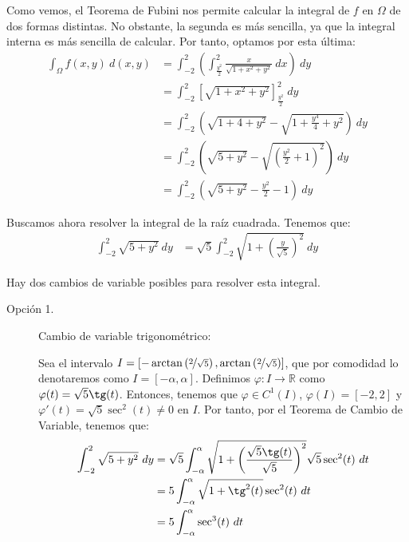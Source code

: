 \begin{ejercicio}
\begin{enumerate}
        Como vemos, el Teorema de Fubini nos permite calcular la integral de $f$ en $\Omega$ de dos formas distintas. No obstante,
        la segunda es más sencilla, ya que la integral interna es más sencilla de calcular. Por tanto, optamos por esta última:
        \begin{align*}
            \int_{\Omega} f(x, y)~d(x, y)
            &= \int_{-2}^{2} \left( \int_{\frac{y^2}{2}}^{2} \frac{x}{\sqrt{1 + x^2 + y^2}}~dx \right)~dy \\
            &= \int_{-2}^{2} \left[ \sqrt{1 + x^2 + y^2} \right]_{\frac{y^2}{2}}^{2}~dy \\
            &= \int_{-2}^{2} \left( \sqrt{1 + 4 + y^2} - \sqrt{1 + \frac{y^4}{4} + y^2} \right)~dy \\
            &= \int_{-2}^{2} \left( \sqrt{5 + y^2} -  \sqrt{\left(\frac{y^2}{2}+1\right)^2} \right)~dy \\
            &= \int_{-2}^{2} \left( \sqrt{5 + y^2} -  \frac{y^2}{2} -1 \right)~dy
        \end{align*}

        Buscamos ahora resolver la integral de la raíz cuadrada. Tenemos que:
        \begin{align*}
            \int_{-2}^{2} \sqrt{5 + y^2}~dy
            &= \sqrt{5}\int_{-2}^{2} \sqrt{1 + \left(\frac{y}{\sqrt{5}}\right)^2}~dy
        \end{align*}

        Hay dos cambios de variable posibles para resolver esta integral.
        \begin{description}
            \item[Opción 1.] Cambio de variable trigonométrico:
            
            Sea el intervalo $I=\left[-\arctan\left(\nicefrac{2}{\sqrt{5}}\right), \arctan\left(\nicefrac{2}{\sqrt{5}}\right)\right]$, 
            que por comodidad lo denotaremos como $I=[-\alpha, \alpha]$. Definimos $\varphi:I \to \mathbb{R}$ como
            $\varphi(t)=\sqrt{5}\tg(t)$. Entonces, tenemos que $\varphi\in C^1(I)$, $\varphi(I)=[-2,2]$ y $\varphi'(t)=\sqrt{5}\sec^2(t)\neq 0$ en $I$. Por tanto,
            por el Teorema de Cambio de Variable, tenemos que:
            \begin{align*}
                \int_{-2}^{2} \sqrt{5 + y^2}~dy
                &= \sqrt{5}\int_{-\alpha}^{\alpha} \sqrt{1 + \left(\frac{\sqrt{5}\tg(t)}{\sqrt{5}}\right)^2}\sqrt{5}\sec^2(t)~dt \\
                &= 5\int_{-\alpha}^{\alpha} \sqrt{1 + \tg^2(t)}\sec^2(t)~dt \\
                &= 5\int_{-\alpha}^{\alpha} \sec^3(t)~dt
            \end{align*}


\end{description}
\end{enumerate}
\end{ejercicio}
